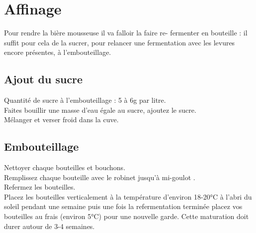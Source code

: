\documentclass[twoside,twocolumn]{report}
\begin{document}
	 \section{Affinage}
			 Pour rendre la bière mousseuse il va falloir la faire re- fermenter en bouteille : il suffit pour cela	 de la sucrer, pour relancer une fermentation avec les levures encore présentes, à l’embouteillage.
			 \subsection{Ajout du sucre}
				 Quantité de sucre à l’embouteillage : 5 à 6g par litre.\\	 
				 Faites bouillir une  masse d’eau égale au sucre, ajoutez le sucre. \\
				 Mélanger et verser froid dans la cuve.\\
			 \subsection{Embouteillage}
				 Nettoyer chaque bouteilles et bouchons.\\
				 Remplissez chaque bouteille avec le robinet  jusqu’à  mi-goulot .\\
				 Refermez les  bouteilles.\\
				 
				 Placez les bouteilles verticalement à la température d’environ 18-20°C à l'abri du soleil pendant une semaine puis une fois la refermentation terminée placez vos bouteilles au frais (environ 5°C) pour une
				 nouvelle garde. Cette maturation doit durer autour de 3-4 semaines.
				 
				 
				 
				 
				 
				 
				 
				 
				 
				 
				
				
				
				
			

			
				
						
		
 

	
\end{document}

